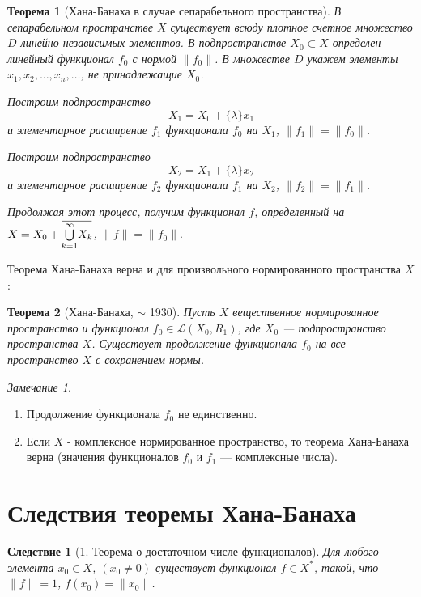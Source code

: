 \documentclass[12pt,a4paper,titlepage,oneside]{book}
\newcommand{\overbar}[1]{\mkern 1.5mu\overline{\mkern-1.5mu#1\mkern-1.5mu}\mkern 1.5mu}
\theoremstyle{definition}
\theoremstyle{plain}
\newtheorem*{theorem}{Теорема}
\theoremstyle{break}
\theoremstyle{remark}
\newtheorem*{remark}{Замечание}
\theoremstyle{remark}
\theoremstyle{remark}
\theoremstyle{remark}
\theoremstyle{plain}
\theoremstyle{plain}
\newtheorem*{corollary}{Следствие}
\begin{document}
\begin{theorem}[Хана-Банаха в случае сепарабельного пространства]
В сепарабельном пространстве $X$ существует всюду плотное счетное множество $D$ линейно независимых элементов. В подпространстве $X_0 \subset X$ определен линейный функционал $f_0$ с нормой $\lVert f_0 \rVert$. В множестве $D$ укажем элементы $x_1, x_2, \ldots, x_n,\ldots$, не принадлежащие $X_0$.

Построим подпространство
$$X_1=X_0+\{ \lambda\}x_1 $$
и элементарное расширение $f_1$ функционала $f_0$ на $X_1$, $\lVert f_1 \rVert= \lVert f_0 \rVert$.

Построим подпространство
$$X_2=X_1+\{ \lambda\}x_2 $$
и элементарное расширение $f_2$ функционала $f_1$ на $X_2$, $\lVert f_2 \rVert= \lVert f_1 \rVert$.

Продолжая этот процесс, получим функционал $f$, определенный на $X=X_0+\overbar{\overset{\infty}{\underset{k=1}{\bigcup}}X_k}$, $\lVert f \rVert= \lVert f_0 \rVert.$
\end{theorem}
Теорема Хана-Банаха верна и для произвольного нормированного пространства $X$: 
\begin{theorem}[Хана-Банаха, $\sim$ 1930]
Пусть $X$ вещественное нормированное пространство и функционал $f_0 \in \mathcal{L}(X_0, R_1)$, где $X_0$ --- подпространство пространства $X$. Существует продолжение функционала $f_0$ на все пространство $X$ с сохранением нормы. 
\end{theorem}
\begin{remark}
\hfill \newline
\begin{enumerate}
\item Продолжение функционала $f_0$ не единственно.
\item Если $X$ - комплексное нормированное пространство, то теорема Хана-Банаха верна (значения функционалов $f_0$ и $f_1$ --- комплексные числа).
\end{enumerate}
\end{remark}

\section{Следствия теоремы Хана-Банаха}

\begin{corollary}[1. Теорема о достаточном числе функционалов]
Для любого элемента $x_0 \in X$, $(x_0 \ne0)$ существует функционал $f \in X^*$, такой, что $\lVert f \rVert=1$, $f(x_0)=\lVert x_0\rVert$.
\end{corollary}
\end{document}
